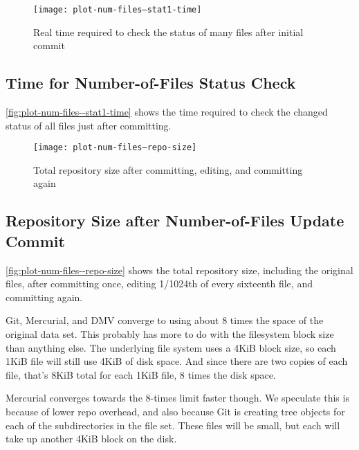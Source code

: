 \begin{figure}[p]
    \begin{leftfullpage}
        \caption{Real time required to check the status of many files after
        initial commit}
        \label{fig:plot-num-files--stat1-time}
        \centering

        \explainlogsubfig

        \texttt{[image: plot-num-files--stat1-time]}
    \end{leftfullpage}
\end{figure}

\cleardoublepage

\subsection{Time for Number-of-Files Status Check}

\autoref{fig:plot-num-files--stat1-time} shows the time
required to check the changed status of all files just after committing.


%


\begin{figure}[p]
    \caption{Total repository size after committing, editing, and committing again}
    \label{fig:plot-num-files--repo-size}
    \centering

    \explaindiskspaceplot

    \texttt{[image: plot-num-files--repo-size]}
\end{figure}

\cleardoublepage

\subsection{Repository Size after Number-of-Files Update Commit}


\autoref{fig:plot-num-files--repo-size} shows the total
repository size, including the original files, after committing once, editing
1/1024th of every sixteenth file, and committing again.

Git, Mercurial, and DMV converge to using about \num{8} times the space of the
original data set. This probably has more to do with the filesystem block size
than anything else. The underlying file system uses a 4KiB block size, so each
1KiB file will still use 4KiB of disk space. And since there are two copies of
each file, that's 8KiB total for each 1KiB file, \num{8} times the disk space.


Mercurial converges towards the \num{8}-times limit faster though. We speculate
this is because of lower repo overhead, and also because Git is creating
\gls{tree} objects for each of the subdirectories in the file set. These files
will be small, but each will take up another 4KiB block on the disk.

%
